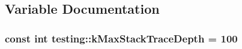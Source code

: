 \subsection{Variable Documentation}
\hypertarget{namespacetesting_ae605f2ccac04616bb7812ca72e517082}{
\subsubsection[{k\+Max\+Stack\+Trace\+Depth}]{\setlength{\rightskip}{0pt plus 5cm}const int testing\+::k\+Max\+Stack\+Trace\+Depth = 100}}\label{namespacetesting_ae605f2ccac04616bb7812ca72e517082}

